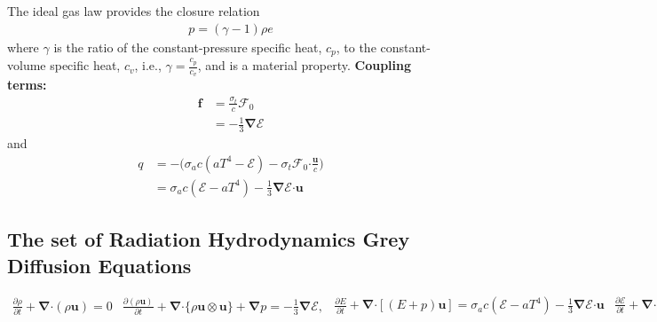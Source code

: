 \documentclass[10pt,letterpaper,notitlepage]{article}
\numberwithin{equation}{section}
\newcommand{\partialderiv}[2]{\frac{\partial #1}{\partial #2}}
\newcommand{\bnabla}{\boldsymbol{\nabla}}
\newcommand{\velocity}{\mathbf{u}}
\newcommand{\dotp}{\boldsymbol{\cdot}}
\newcommand{\RadE}{\mathcal{E}}
\newcommand{\RadF}{\boldsymbol{\mathcal{F}}}
\newcommand{\beqn}{\begin{equation}\begin{aligned}}
\newcommand{\eeqn}{\end{aligned}\end{equation}}
\begin{document}
The ideal gas law provides the closure relation
\beqn 
p = (\gamma - 1) \rho e
\eeqn 
where $\gamma$ is the ratio of the constant-pressure specific heat, $c_p$, to the constant-volume specific heat, $c_v$, i.e., $\gamma = \frac{c_p}{c_v}$, and is a material property.
\newline
\newline
\textbf{Coupling terms:}\newline
\beqn 
\mathbf{f} &= \frac{\sigma_t}{c} \RadF_0 \\ &= -\frac{1}{3} \bnabla \RadE
\eeqn 
and
\beqn 
q &= - \biggr(\sigma_a c (a T^4 - \RadE) - \sigma_t \RadF_0 \dotp \frac{\mathbf{u}}{c} \biggr)\\
&= \sigma_a c (\RadE - a T^4) - \frac{1}{3} \bnabla \RadE \dotp \velocity
\eeqn 

\newpage
\subsection{The set of Radiation Hydrodynamics Grey Diffusion Equations}
\begin{subequations}
\beqn 
\partialderiv{\rho}{t} + \bnabla \dotp (\rho \velocity) = 0
\eeqn 
\beqn 
\partialderiv{(\rho\velocity)}{t} + \bnabla \dotp \{ \rho \velocity \otimes \velocity\}  + \bnabla p 
= -\frac{1}{3} \bnabla \RadE,
\eeqn 
\beqn 
\partialderiv{E}{t} + \bnabla \dotp [(E + p)\velocity] 
= \sigma_a c (\RadE - a T^4) - \frac{1}{3} \bnabla \RadE \dotp \velocity
\eeqn 
\beqn 
\frac{\partial \RadE}{\partial t} 
+\bnabla \dotp \biggr(  -\frac{c}{3\sigma_t} \bnabla \RadE \biggr) + \frac{4}{3} \bnabla \bigr( \RadE \mathbf{u}  \bigr)
&=  \sigma_a c \bigr( aT^4 - \RadE \bigr)
+\frac{1}{3} \bnabla \RadE  \dotp \velocity.
\eeqn
where
\beqn 
E = \frac{1}{2} \rho ||\velocity||^2 + \rho e,
\eeqn 
\beqn 
p = (\gamma - 1) \rho e,
\eeqn 
\beqn 
T = \frac{1}{C_v} e
\eeqn 
\end{subequations}
\end{document}
